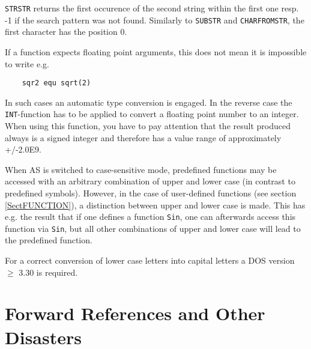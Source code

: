 \documentclass[12pt,twoside]{report}
\newcommand{\tty}[1]{{\tt #1}}
\newcommand{\asname}{{AS}}
\begin{document}
\tty{STRSTR} returns the first occurence of the second string
within the first one resp. -1 if the search pattern was not found.
Similarly to \tty{SUBSTR} and  \tty{CHARFROMSTR}, the first character
has the position 0.

If a function expects floating point arguments, this does not mean it
is impossible to write e.g.
\begin{verbatim}
    sqr2 equ sqrt(2)
\end{verbatim}
In such cases an automatic type conversion is engaged. In the reverse
case the \tty{INT}-function has to be applied to convert a floating point
number to an integer.  When using this function, you have to pay
attention that the result produced always is a signed integer and
therefore has a value range of approximately +/-2.0E9.

When \asname{} is switched to case-sensitive mode, predefined functions may be
accessed with an arbitrary combination of upper and lower case (in
contrast to predefined symbols).  However, in the case of user-defined
functions (see section \ref{SectFUNCTION}), a distinction between upper
and lower case is made.  This has e.g. the result that if one defines a
function \tty{Sin}, one can afterwards access this function via \tty{Sin}, but all
other combinations of upper and lower case will lead to the predefined
function.

For a correct conversion  of lower case letters
into capital letters a DOS version $\geq$ 3.30 is required.


\section{Forward References and Other Disasters}
\label{ForwRefs}
\end{document}

